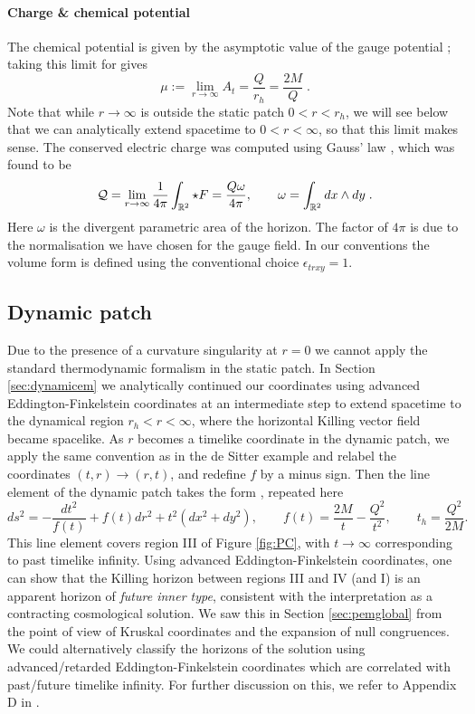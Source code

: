 \paragraph{Charge \& chemical potential}
The chemical potential is given by the asymptotic value of the gauge potential \cite{Hartnoll:2009sz}; taking this limit for  gives 
\begin{equation*}
    \mu :=  \lim_{r \rightarrow \infty} A_t = \frac{Q}{r_h} = \frac{2 M}{Q} \;.
\end{equation*}
Note that while $r \rightarrow \infty$ is outside the static patch $0<r<r_h$, we will see below that we can analytically extend spacetime to $0<r<\infty$, so that this limit makes sense. The conserved electric charge was computed using Gauss' law , which was found to be
\begin{equation*}
    \mathcal{Q} = \lim_{r \to \infty} \frac{1}{4\pi} \int_{{\mathbb{R}}^2} \star F = \frac{Q \omega}{4\pi}, \qquad \omega = \int_{{\mathbb{R}}^2} dx \wedge dy \;.
\end{equation*}
Here $\omega$ is the divergent parametric area of the horizon. The factor of $4\pi$ is due to the normalisation we have chosen for the gauge field. In our conventions the volume form is defined using the conventional choice $\epsilon_{trxy} = 1$.

\subsection{Dynamic patch}

Due to the presence of a curvature singularity at $r=0$ we cannot apply the standard thermodynamic formalism in the static patch. In Section \ref{sec:dynamicem} we analytically continued our coordinates using advanced Eddington-Finkelstein coordinates at an intermediate step to extend spacetime to the dynamical region $r_h < r < \infty$, where the horizontal Killing vector field became spacelike. As $r$ becomes a timelike coordinate in the dynamic patch, we apply the same convention as in the de Sitter example and relabel the coordinates $(t,r) \rightarrow (r,t)$, and redefine $f$ by a minus sign. Then the line element of the dynamic patch takes the form , repeated here
\begin{equation}
\label{eq:planarEM2}
    ds^2 = -\frac{dt^{2}}{f(t)} +  f(t) dr^{ 2}  + t^{2} (dx^2 + dy^2) ,\qquad f(t) = \frac{2M}{t} - \frac{Q^2}{t^2} , \qquad t_h = \frac{Q^2}{2M}.
\end{equation}
This line element covers region III of Figure \ref{fig:PC}, with $t\rightarrow \infty$ corresponding to past timelike infinity. Using advanced Eddington-Finkelstein coordinates, one can show that the Killing horizon between regions III and IV (and I) is an apparent horizon of \emph{future inner type}, consistent with the interpretation as a contracting cosmological solution. We saw this in Section \ref{sec:pemglobal} from the point of view of Kruskal coordinates and the expansion of null congruences. We could alternatively classify the horizons of the solution using advanced/retarded Eddington-Finkelstein coordinates which are correlated with past/future timelike infinity. For further discussion on this, we refer to Appendix D in \cite{Gutowski:2020fzb}.

